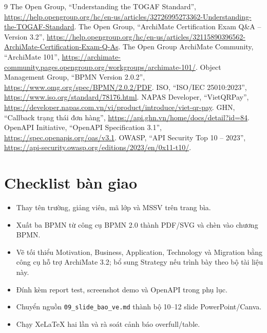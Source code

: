 \documentclass[12pt,a4paper]{report}
\newcommand{\code}[1]{\texttt{#1}}
\begin{document}
\begin{thebibliography}{9}
 The Open Group, ``Understanding the TOGAF Standard'', \url{https://help.opengroup.org/hc/en-us/articles/32726995273362-Understanding-the-TOGAF-Standard}.
 The Open Group, ``ArchiMate Certification Exam Q\&A -- Version 3.2'', \url{https://help.opengroup.org/hc/en-us/articles/32115890396562-ArchiMate-Certification-Exam-Q-As}.
 The Open Group ArchiMate Community, ``ArchiMate 101'', \url{https://archimate-community.pages.opengroup.org/workgroups/archimate-101/}.
 Object Management Group, ``BPMN Version 2.0.2'', \url{https://www.omg.org/spec/BPMN/2.0.2/PDF}.
 ISO, ``ISO/IEC 25010:2023'', \url{https://www.iso.org/standard/78176.html}.
 NAPAS Developer, ``VietQRPay'', \url{https://developer.napas.com.vn/vi/product/introduce/viet-qr-pay}.
 GHN, ``Callback trạng thái đơn hàng'', \url{https://api.ghn.vn/home/docs/detail?id=84}.
 OpenAPI Initiative, ``OpenAPI Specification 3.1'', \url{https://spec.openapis.org/oas/v3.1}.
 OWASP, ``API Security Top 10 -- 2023'', \url{https://api-security.owasp.org/editions/2023/en/0x11-t10/}.
\end{thebibliography}

\appendix
\chapter{Checklist bàn giao}
\begin{itemize}
\item Thay tên trường, giảng viên, mã lớp và MSSV trên trang bìa.
\item Xuất ba BPMN từ công cụ BPMN 2.0 thành PDF/SVG và chèn vào chương BPMN.
\item Vẽ tối thiểu Motivation, Business, Application, Technology và Migration bằng công cụ hỗ trợ ArchiMate 3.2; bổ sung Strategy nếu trình bày theo bộ tài liệu này.
\item Đính kèm report test, screenshot demo và OpenAPI trong phụ lục.
\item Chuyển nguồn \code{09\_slide\_bao\_ve.md} thành bộ 10--12 slide PowerPoint/Canva.
\item Chạy XeLaTeX hai lần và rà soát cảnh báo overfull/table.
\end{itemize}
\end{document}
